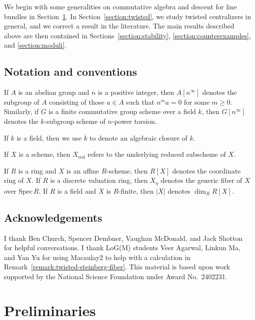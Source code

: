 \documentclass[11pt,reqno]{amsart}
\theoremstyle{definition}
\renewcommand{\rm}{\mathrm}
\newcommand{\Spec}{\mathrm{Spec} \,}
\newcommand{\ov}[1]{\overline{#1}}
\begin{document}
We begin with some generalities on commutative algebra and descent for line bundles in Section~\ref{section:prelim}. In Section~\ref{section:twisted}, we study twisted centralizers in general, and we correct a result in the literature. The main results described above are then contained in Sections~\ref{section:stability}, \ref{section:counterexamples}, and \ref{section:moduli}.

\subsection{Notation and conventions}

If $A$ is an abelian group and $n$ is a positive integer, then $A[n^\infty]$ denotes the subgroup of $A$ consisting of those $a \in A$ such that $n^m a = 0$ for some $m \geq 0$. Similarly, if $G$ is a finite commutative group scheme over a field $k$, then $G[n^\infty]$ denotes the $k$-subgroup scheme of $n$-power torsion.

If $k$ is a field, then we use $\ov{k}$ to denote an algebraic closure of $k$.

If $X$ is a scheme, then $X_{\rm{red}}$ refers to the underlying reduced subscheme of $X$.

If $R$ is a ring and $X$ is an affine $R$-scheme, then $R[X]$ denotes the coordinate ring of $X$. If $R$ is a discrete valuation ring, then $X_\eta$ denotes the generic fiber of $X$ over $\Spec R$. If $R$ is a field and $X$ is $R$-finite, then $|X|$ denotes $\dim_R R[X]$.











\subsection{Acknowledgements}

I thank Ben Church, Spencer Dembner, Vaughan McDonald, and Jack Shotton for helpful conversations. I thank LoG(M) students Veer Agarwal, Linkun Ma, and Yan Yu for using Macaulay2 to help with a calculation in Remark~\ref{remark:twisted-steinberg-fiber}. This material is based upon work supported by the National Science Foundation under Award No.\ 2402231.








\section{Preliminaries}\label{section:prelim}
\end{document}
